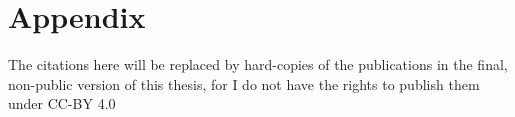 \chapter{Appendix}

The citations here will be replaced by hard-copies of the publications in the final, non-public version of this thesis, for I do not have the rights to publish them under CC-BY 4.0

\cite{mp_Braeutigam2011}

\cite{mp_Schulze2012}

\cite{mp_Hamisch2012}

\cite{mp_Schliesky2012}

\cite{mp_Bhide2014}

\cite{mp_Braeutigam2014}
